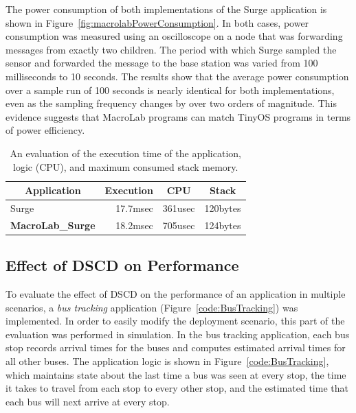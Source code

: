 The power consumption of both implementations of the Surge application is shown
in Figure~\ref{fig:macrolabPowerConsumption}.  In both cases, power consumption was
measured using an oscilloscope on a node that was forwarding messages from
exactly two children.  The period with which Surge sampled the sensor and
forwarded the message to the base station was varied from 100 milliseconds to 10
seconds. The results show that the average power consumption over a sample run
of 100 seconds is nearly identical for both implementations, even as the
sampling frequency changes by over two orders of magnitude.  This evidence
suggests that MacroLab programs can match TinyOS programs in terms of power
efficiency.

\begin{table}[!htb]
  \centering
  \begin{minipage}{\columnwidth}
    \centering
    \begin{tabular}{|l|r|r|r|}
      \hline
      \multicolumn{1}{|c}{Application}& 
      \multicolumn{1}{|c|}{Execution} &
      \multicolumn{1}{|c|}{CPU} &
      \multicolumn{1}{c|}{Stack}\\
      \hline
      Surge&17.7msec&361usec&120bytes\\
      \bf{MacroLab\_Surge}&18.2msec&705usec&124bytes\\
      \hline
    \end{tabular}
  \end{minipage}
  \caption[Execution time analysis]{An evaluation of the execution time of the application, logic (CPU), and maximum
  consumed stack memory.}
  \label{table:ExecutionTime}
\end{table}


\subsection{Effect of DSCD on Performance}\label{sect:PerformanceEval}

To evaluate the effect of DSCD on the performance of an application in multiple
scenarios, a {\em bus tracking} application (Figure~\ref{code:BusTracking}) was
implemented.  In order to easily modify the deployment scenario, this part of
the evaluation was performed in simulation.  In the bus tracking application,
each bus stop records arrival times for the buses and computes estimated arrival
times for all other buses. The application logic is shown in
Figure~\ref{code:BusTracking}, which maintains state about the last time a bus
was seen at every stop, the time it takes to travel from each stop to every
other stop, and the estimated time that each bus will next arrive at every stop.

